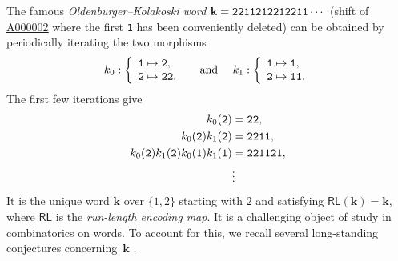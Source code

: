 \documentclass[12pt,reqno]{article}
\newcommand{\seqnum}[1]{\href{https://oeis.org/#1}{\rm \underline{#1}}}
\begin{document}
The famous {\em Oldenburger--Kolakoski word} $\mathbf{k}={\tt 2211212212211}\cdots$ (shift of \seqnum{A000002} where the first {\tt 1} has been conveniently deleted) can be obtained by periodically iterating the two morphisms \cite{CulikLepisto}
\[
  k_0:\left\{\begin{array}{l}
               {\tt 1}\mapsto {\tt 2},\\
               {\tt 2}\mapsto {\tt 2}{\tt 2},\\
             \end{array}\right.
           \quad\text{ and }\quad
k_1: \left\{\begin{array}{l}
               {\tt 1}\mapsto {\tt 1},\\
               {\tt 2}\mapsto {\tt 1}{\tt 1}.\\
            \end{array} \right.
\]
The first few iterations give
\begin{align*}
  k_0({\tt 2})&={\tt 22},\\
  k_0({\tt 2})k_1({\tt 2})&={\tt 2211},\\
  k_0({\tt 2})k_1({\tt 2})k_0({\tt 1})k_1({\tt 1})&={\tt 221121}, \\
  &\vdots 
\end{align*}
It is the unique word $\mathbf{k}$ over $\{1,2\}$ starting with $2$ and satisfying $\mathsf{RL}(\mathbf{k})=\mathbf{k}$, where $\mathsf{RL}$ is the \emph{run-length encoding map}.  It is a challenging object of study in combinatorics on words.  To account for this,  we recall several long-standing conjectures concerning~$\mathbf{k}$ \cite{Sing}.
\end{document}
